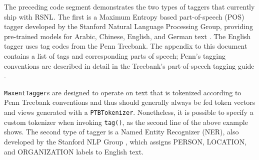 \documentclass[11pt]{article}
\def\RSNL{{\normalfont\fontseries{b}\selectfont RSNL}}
\let\code=\texttt
\let\rclass=\texttt
\begin{document}
The preceding code segment demonstrates the two types of taggers that
currently ship with \RSNL.  The first is a Maximum Entropy based
part-of-speech (POS) tagger developed by the Stanford Natural Language
Processing Group, providing pre-trained models for Arabic, Chinese,
English, and German text \cite{pos}.  The English tagger uses tag
codes from the Penn Treebank.  The appendix to this document contains
a list of tags and corresponding parts of speech; Penn's tagging
conventions are described in detail in the Treebank's part-of-speech
tagging guide \cite{ptb}.

\rclass{MaxentTagger}s are designed to operate on text that is
tokenized according to Penn Treebank conventions and thus should
generally always be fed token vectors and views generated with a
\rclass{PTBTokenizer}.  Nonetheless, it is possible to specify a
custom tokenizer when invoking \code{tag()}, as the second line of the
above example shows.  The second type of tagger is a Named Entity
Recognizer (NER), also developed by the Stanford NLP Group \cite{ner},
which assigns PERSON, LOCATION, and ORGANIZATION labels to English
text.
\end{document}
